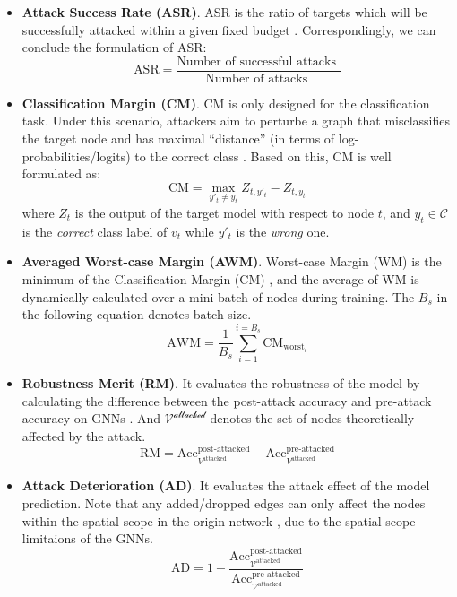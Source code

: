 \begin{itemize}
	\item \textbf{Attack Success Rate (ASR)}. ASR is the ratio of targets which will be successfully attacked within a given fixed budget \cite{chen2018link}. Correspondingly, we can conclude the formulation of ASR:
	      \begin{equation}
		      \text{ASR}=\frac{\text {Number  of  successful  attacks }}{\text {Number  of  attacks }}
	      \end{equation}

	\item \textbf{Classification Margin (CM)}. CM is only designed for the classification task. Under this scenario, attackers aim to perturbe a graph that misclassifies the target node and has maximal ``distance'' (in terms of log-probabilities/logits) to the correct class \cite{zugner2018adversarial}. Based on this, CM is well formulated as:
	      \begin{equation}
		      \text{CM}=\max_{y'_t \neq y_t} Z_{t,y'_t}-Z_{t,y_t}
	      \end{equation}
	      where $Z_t$ is the output of the target model with respect to node $t$, and $y_t \in \mathcal{C}$ is the \emph{correct} class label of $v_t$ while $y'_t$ is the \emph{wrong} one.

	\item \textbf{Averaged Worst-case Margin (AWM)}. Worst-case Margin (WM) is the minimum of the Classification Margin (CM) \cite{zugner2019certifiable}, and the average of WM is dynamically calculated over a mini-batch of nodes during training. The $B_s$ in the following equation denotes batch size.
	      \begin{equation}
		      \text{AWM} = \frac{1}{B_s} \sum^{i=B_s}_{i=1} \text{CM}_{\text{worst}_i}
	      \end{equation}

	\item \textbf{Robustness Merit (RM)}. It evaluates the robustness of the model by calculating the difference between the post-attack accuracy and pre-attack accuracy on GNNs \cite{jin2019power}. And $\mathcal{V^\text{attacked}}$ denotes the set of nodes theoretically affected by the attack.
	      \begin{equation}
		      \text{RM}=\text{Acc}_{V^{\text{attacked}}}^{\text{post-attacked}}-\text{Acc}^{\text{pre-attacked}}_{V^{\text{attacked}}}
	      \end{equation}

	\item \textbf{Attack Deterioration (AD)}. It evaluates the attack effect of the model prediction. Note that any added/dropped edges can only affect the nodes within the spatial scope in the origin network \cite{jin2019power}, due to the spatial scope limitaions of the GNNs.
	      \begin{equation}
		      \text{AD}=1-\frac{\text{Acc}^{\text{post-attacked}}_{\mathcal{V}^{\text{attacked}}}}{\text{Acc}^{\text{pre-attacked}}_{\mathcal{V}^{\text{attacked}}}}
	      \end{equation}


\end{itemize}
